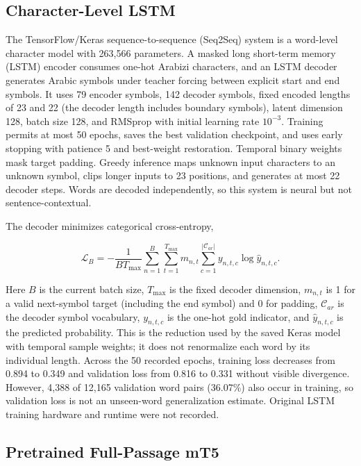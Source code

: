 \documentclass[runningheads]{llncs}
\begin{document}
\subsection{Character-Level LSTM}

The TensorFlow/Keras sequence-to-sequence (Seq2Seq) system is a word-level character model with 263,566 parameters. A masked long short-term memory (LSTM) encoder consumes one-hot Arabizi characters, and an LSTM decoder generates Arabic symbols under teacher forcing between explicit start and end symbols. It uses 79 encoder symbols, 142 decoder symbols, fixed encoded lengths of 23 and 22 (the decoder length includes boundary symbols), latent dimension 128, batch size 128, and RMSprop with initial learning rate $10^{-3}$. Training permits at most 50 epochs, saves the best validation checkpoint, and uses early stopping with patience 5 and best-weight restoration. Temporal binary weights mask target padding. Greedy inference maps unknown input characters to an unknown symbol, clips longer inputs to 23 positions, and generates at most 22 decoder steps. Words are decoded independently, so this system is neural but not sentence-contextual.

The decoder minimizes categorical cross-entropy,

\begin{equation}
\mathcal{L}_{B}=-\frac{1}{B T_{\max}}
\sum_{n=1}^{B}\sum_{t=1}^{T_{\max}}m_{n,t}
\sum_{c=1}^{|\mathcal{C}_{ar}|}y_{n,t,c}\log \hat{y}_{n,t,c}.
\end{equation}

Here $B$ is the current batch size, $T_{\max}$ is the fixed decoder dimension, $m_{n,t}$ is 1 for a valid next-symbol target (including the end symbol) and 0 for padding, $\mathcal{C}_{ar}$ is the decoder symbol vocabulary, $y_{n,t,c}$ is the one-hot gold indicator, and $\hat{y}_{n,t,c}$ is the predicted probability. This is the reduction used by the saved Keras model with temporal sample weights; it does not renormalize each word by its individual length. Across the 50 recorded epochs, training loss decreases from 0.894 to 0.349 and validation loss from 0.816 to 0.331 without visible divergence. However, 4,388 of 12,165 validation word pairs (36.07\%) also occur in training, so validation loss is not an unseen-word generalization estimate. Original LSTM training hardware and runtime were not recorded.

\subsection{Pretrained Full-Passage mT5}
\end{document}
